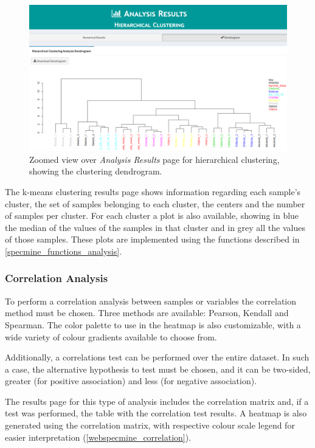 \begin{figure}[h]
	\centering
	\includegraphics[width=0.9\linewidth]{Imagens/webspecmine_clustering}
	\caption{Zoomed view over \textit{Analysis Results} page for hierarchical clustering, showing the clustering dendrogram.}
	\label{webspecmine_clustering}
\end{figure}

The k-means clustering results page shows information regarding each sample's cluster, the set of samples belonging to each cluster, the centers and the number of samples per cluster. For each cluster a plot is also available, showing in blue the median of the values of the samples in that cluster and in grey all the values of those samples. These plots are implemented using the functions described in \autoref{specmine_functions_analysis}.



\subsubsection{Correlation Analysis}

To perform a correlation analysis between samples or variables the correlation method must be chosen. Three methods are available: Pearson, Kendall and Spearman. The color palette to use in the heatmap is also customizable, with a wide variety of colour gradients available to choose from.

Additionally, a correlations test can be performed over the entire dataset. In such a case, the alternative hypothesis to test must be chosen, and it can be two-sided, greater (for positive association) and less (for negative association).

The results page for this type of analysis includes the correlation matrix and, if a test was performed, the table with the correlation test results. A heatmap is also generated using the correlation matrix, with respective colour scale legend for easier interpretation (\autoref{webspecmine_correlation}).

